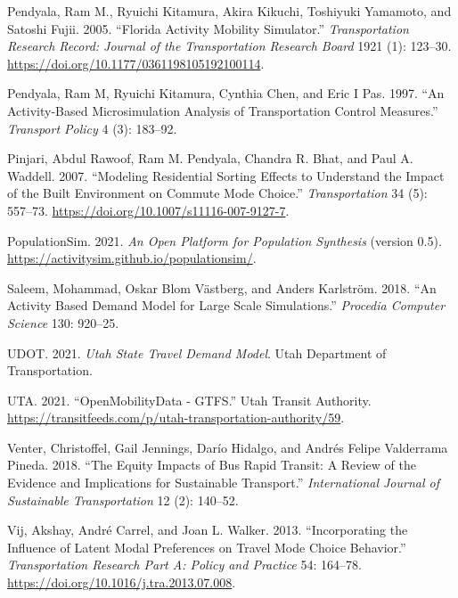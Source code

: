\documentclass[12pt, oneside, openright]{byuthesis}
\newlength{\cslhangindent}
\newlength{\cslentryspacingunit} %
\newenvironment{CSLReferences}[2] %
 {%
  \setlength{\parindent}{0pt}
  \ifodd #1
  \let\oldpar\par
  \def\par{\hangindent=\cslhangindent\oldpar}
  \fi
  \setlength{\parskip}{#2\cslentryspacingunit}
 }%
 {}
\begin{document}
\begin{CSLReferences}{1}{0}
\leavevmode{}%
Pendyala, Ram M., Ryuichi Kitamura, Akira Kikuchi, Toshiyuki Yamamoto, and Satoshi Fujii. 2005. {``Florida Activity Mobility Simulator.''} \emph{Transportation Research Record: Journal of the Transportation Research Board} 1921 (1): 123--30. \url{https://doi.org/10.1177/0361198105192100114}.

\leavevmode{}%
Pendyala, Ram M, Ryuichi Kitamura, Cynthia Chen, and Eric I Pas. 1997. {``An Activity-Based Microsimulation Analysis of Transportation Control Measures.''} \emph{Transport Policy} 4 (3): 183--92.

\leavevmode{}%
Pinjari, Abdul Rawoof, Ram M. Pendyala, Chandra R. Bhat, and Paul A. Waddell. 2007. {``Modeling Residential Sorting Effects to Understand the Impact of the Built Environment on Commute Mode Choice.''} \emph{Transportation} 34 (5): 557--73. \url{https://doi.org/10.1007/s11116-007-9127-7}.

\leavevmode{}%
PopulationSim. 2021. \emph{An Open Platform for Population Synthesis} (version 0.5). \url{https://activitysim.github.io/populationsim/}.

\leavevmode{}%
Saleem, Mohammad, Oskar Blom Västberg, and Anders Karlström. 2018. {``An Activity Based Demand Model for Large Scale Simulations.''} \emph{Procedia Computer Science} 130: 920--25.

\leavevmode{}%
UDOT. 2021. \emph{Utah State Travel Demand Model}. Utah Department of Transportation.

\leavevmode{}%
UTA. 2021. {``OpenMobilityData - GTFS.''} Utah Transit Authority. \url{https://transitfeeds.com/p/utah-transportation-authority/59}.

\leavevmode{}%
Venter, Christoffel, Gail Jennings, Darío Hidalgo, and Andrés Felipe Valderrama Pineda. 2018. {``The Equity Impacts of Bus Rapid Transit: A Review of the Evidence and Implications for Sustainable Transport.''} \emph{International Journal of Sustainable Transportation} 12 (2): 140--52.

\leavevmode{}%
Vij, Akshay, André Carrel, and Joan L. Walker. 2013. {``Incorporating the Influence of Latent Modal Preferences on Travel Mode Choice Behavior.''} \emph{Transportation Research Part A: Policy and Practice} 54: 164--78. \url{https://doi.org/10.1016/j.tra.2013.07.008}.


\end{CSLReferences}
\end{document}
